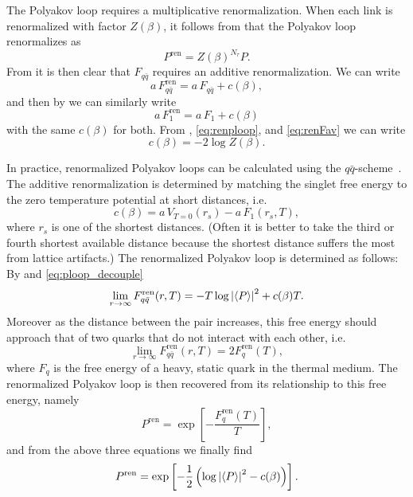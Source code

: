 The Polyakov loop requires a multiplicative renormalization. When each link
is renormalized with factor $Z(\beta)$, it follows from
 that the Polyakov loop renormalizes as
\begin{equation}\label{eq:renploop}
  P^{\text{ren}}=Z(\beta)^{N_\tau}P.
\end{equation}
From  it is then clear that $F_{q\bar{q}}$ requires an
additive renormalization. We can write
\begin{equation}\label{eq:renFav}
  a\,F_{q\bar{q}}^{\text{ren}}=a\,F_{q\bar{q}}+c(\beta),
\end{equation}
and then by  we can similarly write
\begin{equation}
  a\,F_1^{\text{ren}}=a\,F_1+c(\beta)
\end{equation}
with the same $c(\beta)$ for both. From ,
\eqref{eq:renploop}, and \eqref{eq:renFav} we can write
\begin{equation}
  c(\beta)=-2\log Z(\beta).
\end{equation}

In practice, renormalized Polyakov loops can be calculated using
the $q\bar{q}$-scheme~\cite{kaczmarek_heavy_2002}. The additive
renormalization is determined by matching the singlet free energy
to the zero temperature potential at short distances, i.e.
\begin{equation}
  c(\beta)=a\,V_{T=0}(r_s)-a\,F_1(r_s,T),
\end{equation}
where $r_s$ is one of the shortest distances. (Often it is better to take
the third or fourth shortest available distance because the shortest
distance suffers the most from lattice artifacts.) The renormalized
Polyakov loop is determined as follows:
By  and \eqref{eq:ploop_decouple}
\begin{equation}
  \lim_{r\to\infty}F_{q\bar{q}}^{\text{ren}}(r,T)
             =-T\log\left|\ev{P}\right|^2+c(\beta)T.
\end{equation}
Moreover as the distance between the pair increases, this free energy
should approach that of two quarks that do not interact with each other, i.e.
\begin{equation}
  \lim_{r\to\infty}F_{q\bar{q}}^{\text{ren}}(r,T)=2F_q^{\text{ren}}(T),
\end{equation}
where $F_q$ is the free energy of a heavy, static quark in the thermal
medium. The renormalized Polyakov loop is then recovered from its
relationship to this free energy, namely
\begin{equation}
  P^{\text{ren}}=\exp\left[-\frac{F_q^{\text{ren}}(T)}{T}\right],
\end{equation}
and from the above three equations we finally find
\begin{equation}
  P^{\text{ren}}=\exp\left[-\frac{1}{2}\left(\log\left|\ev{P}\right|^2
                                             -c(\beta)\right)\right].
\end{equation}

